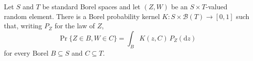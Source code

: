 Let \(S\) and \(T\) be standard Borel spaces and let \((Z,W)\) be an \(S\times T\)-valued random element.  There is a Borel probability kernel \(K:S\times\mathcal B(T)\to[0,1]\) such that, writing \(P_Z\) for the law of \(Z\),
\[
 \Pr\{Z\in B,W\in C\}=\int_B K(z,C)\,P_Z(\mathrm dz)
\]
for every Borel \(B\subseteq S\) and \(C\subseteq T\).